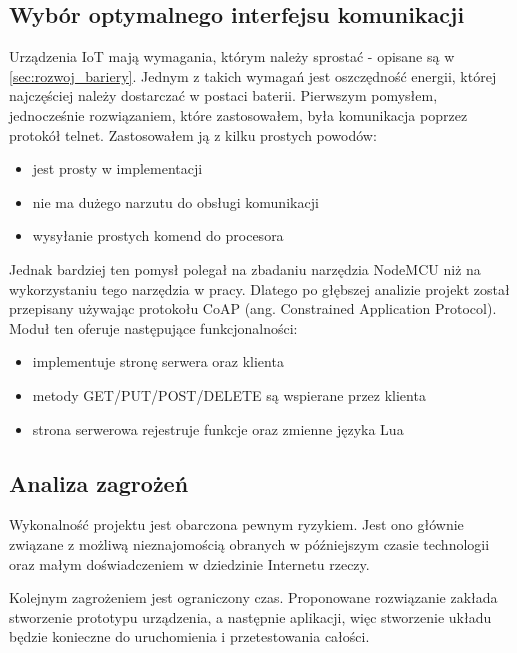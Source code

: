 \subsection{Wybór optymalnego interfejsu komunikacji}
Urządzenia IoT mają wymagania, którym należy sprostać - opisane są w \autoref{sec:rozwoj_bariery}. Jednym z takich wymagań jest oszczędność energii, której najczęściej należy dostarczać w postaci baterii. Pierwszym pomysłem, jednocześnie rozwiązaniem, które zastosowałem, była komunikacja poprzez protokół telnet. Zastosowałem ją z kilku prostych powodów:
\begin{itemize}
	\item jest prosty w implementacji 
	\item nie ma dużego narzutu do obsługi komunikacji 
	\item wysyłanie prostych komend do procesora
\end{itemize}
Jednak bardziej ten pomysł polegał na zbadaniu narzędzia NodeMCU\cite{nodemcu-www} niż na wykorzystaniu tego narzędzia w pracy. Dlatego po głębszej analizie projekt został przepisany używając protokołu CoAP (ang. Constrained Application Protocol). Moduł ten oferuje następujące funkcjonalności: 
\begin{itemize}
	\item implementuje stronę serwera oraz klienta 
	\item metody GET/PUT/POST/DELETE są wspierane przez klienta
	\item strona serwerowa rejestruje funkcje oraz zmienne języka Lua
\end{itemize}

\subsection{Analiza zagrożeń}
Wykonalność projektu jest obarczona pewnym ryzykiem. Jest ono głównie związane z możliwą nieznajomością obranych w późniejszym czasie technologii oraz małym doświadczeniem w dziedzinie Internetu rzeczy.

Kolejnym zagrożeniem jest ograniczony czas. Proponowane rozwiązanie zakłada stworzenie prototypu urządzenia, a następnie aplikacji, więc stworzenie układu będzie konieczne do uruchomienia i przetestowania całości.
